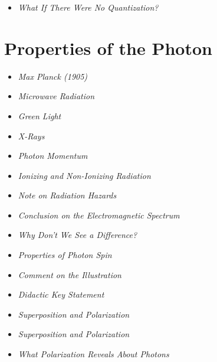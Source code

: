 \vspace{1em}
\begin{tcolorbox}[title=Hypothesis Boxes, hypobox]
	\begin{itemize}
		\item \emph{What If There Were No Quantization?} \dotfill\pageref{box:hypo-keine-quanten}
	\end{itemize}
\end{tcolorbox}

\section{Properties of the Photon}
\vspace{1em}
\begin{tcolorbox}[title=Physical Boxes,physikbox]
	
	\begin{itemize}
		\item \emph{Max Planck (1905)} \dotfill\pageref{box:planck1948}
		\item \emph{Microwave Radiation} \dotfill\pageref{box:Mikrowellenstrahlung}
		\item \emph{Green Light} \dotfill\pageref{box:grünesLicht}
		\item \emph{X-Rays} \dotfill\pageref{box:röntgenstrahlen}
		\item \emph{Photon Momentum} \dotfill\pageref{box:Photonenimpuls}
		\item \emph{Ionizing and Non-Ionizing Radiation} \dotfill\pageref{box:ionisierende}
		\item \emph{Note on Radiation Hazards} \dotfill\pageref{box:Hinweis zur Gefärdung}
		\item \emph{Conclusion on the Electromagnetic Spectrum} \dotfill\pageref{box:Fazit zum elektro}
		\item \emph{Why Don’t We See a Difference?} \dotfill\pageref{box:Warum sieht man}
		\item \emph{Properties of Photon Spin} \dotfill\pageref{box:Eigenschaften des}
		\item \emph{Comment on the Illustration} \dotfill\pageref{box:Kommentar zur Darstellung}
		\item \emph{Didactic Key Statement} \dotfill\pageref{box:didaktischerMerksatz}
		\item \emph{Superposition and Polarization} \dotfill\pageref{box:Superposition}
		\item \emph{Superposition and Polarization} \dotfill\pageref{box:Superposition und Polarisation}
		\item \emph{What Polarization Reveals About Photons} \dotfill\pageref{box:Was uns die}
	\end{itemize}
\end{tcolorbox}

